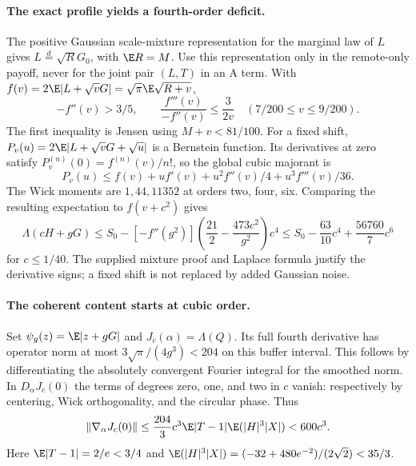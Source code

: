 \paragraph{The exact profile yields a fourth-order deficit.}
The positive Gaussian scale-mixture representation for the marginal
law of $L$ gives $L\overset d=\sqrt R G_0$, with
$\E R=M$. Use this representation only in the remote-only payoff,
never for the joint pair $(L,T)$ in an A term. With
$f(v)=2\E|L+\sqrt vG|=\sqrt\pi\E\sqrt{R+v}$,
\[
 -f''(v)>3/5,\qquad
 \frac{f'''(v)}{-f''(v)}\le\frac3{2v}
 \quad (7/200\le v\le9/200).
\]
The first inequality is Jensen using $M+v<81/100$.
For a fixed shift, $P_v(u)=2\E|L+\sqrt vG+\sqrt u|$ is a Bernstein
function. Its derivatives at zero satisfy
$P_v^{(n)}(0)=f^{(n)}(v)/n!$, so the global cubic majorant is
\[
 P_v(u)\le f(v)+u f'(v)+u^2f''(v)/4+u^3f'''(v)/36.
\]
The Wick moments are $1,44,11352$ at orders two, four, six. Comparing
the resulting expectation to $f(v+c^2)$ gives
\[
 \Lambda(cH+gG)
 \le S_0-[-f''(g^2)]\left(\frac{21}{2}
                       -\frac{473c^2}{g^2}\right)c^4
 \le S_0-\frac{63}{10}c^4+\frac{56760}{7}c^6
\]
for $c\le1/40$. The supplied mixture proof and Laplace formula justify
the derivative signs; a fixed shift is not replaced by added Gaussian
noise.

\paragraph{The coherent content starts at cubic order.}
Set $\psi_g(z)=\E|z+gG|$ and $J_c(\alpha)=\Lambda(Q)$.
Its full fourth derivative has operator norm at most
$3\sqrt\pi/(4g^3)<204$ on this buffer interval. This follows by
differentiating the absolutely convergent Fourier integral for the
smoothed norm. In $D_\alpha J_c(0)$ the terms of degrees zero, one,
and two in $c$ vanish: respectively by centering, Wick orthogonality,
and the circular phase. Thus
\[
 \|\nabla_\alpha J_c(0)\|
 \le\frac{204}{3}c^3\E|T-1|\E(|H|^3|X|)<600c^3.
\]
Here $\E|T-1|=2/e<3/4$ and
$\E(|H|^3|X|)=(-32+480e^{-2})/(2\sqrt2)<35/3$.

